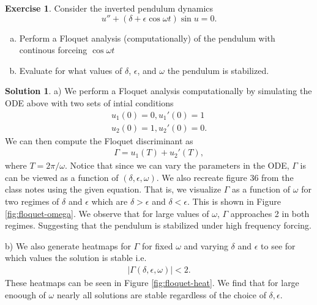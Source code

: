 \documentclass[12pt]{article}
\newcommand{\abs}[1]{ \left| #1 \right| }
\theoremstyle{definition}
\newtheorem{exer}{Exercise}
\newtheorem{sol}{Solution}
\theoremstyle{remark}
\begin{document}
\begin{exer}

Consider the inverted pendulum dynamics
\begin{equation*}
    u'' + (\delta + \epsilon \cos \omega t) \sin u = 0.
\end{equation*}
\begin{enumerate}[(a)]
    \item Perform a Floquet analysis (computationally) of the pendulum with continous forceing $\cos \omega t$ 
    \item Evaluate for what values of $\delta$, $\epsilon$, and $\omega$ the pendulum is stabilized.
\end{enumerate}
\end{exer}

\begin{sol}
    a) We perform a Floquet analysis computationally by simulating the ODE above with two sets of intial conditions
    \begin{align*}
        u_{1}(0) = 0, u_{1}'(0) = 1\\
        u_{2}(0) = 1, u_{2}'(0) = 0.
    \end{align*}
    We can then compute the Floquet discriminant as
    \begin{align*}
        \Gamma = u_{1}(T) + u_{2}'(T),
    \end{align*}
    where $T = 2\pi / \omega$. Notice that since we can vary the parameters in the ODE, $\Gamma$ is can be viewed as a function of $(\delta, \epsilon, \omega)$. We also recreate figure 36 from the class notes using the given equation. That is, we visualize $\Gamma$ as a function of $\omega$ for two regimes of  $\delta$ and  $\epsilon$ which are  $\delta > \epsilon$ and  $\delta < \epsilon$. This is shown in Figure \ref{fig:floquet-omega}. We observe that for large values of $\omega$, $\Gamma$ approaches 2 in both regimes. Suggesting that the pendulum is stabilized under high frequency forcing.

    b) We also generate heatmaps for $\Gamma$ for fixed $\omega$ and varying $\delta$ and $\epsilon$ to see for which values the solution is stable i.e. 
    \begin{align*}
    \abs{\Gamma(\delta, \epsilon, \omega)} < 2. 
    \end{align*}
    These heatmaps can be seen in Figure \ref{fig:floquet-heat}. We find that for large enoough of $\omega$ nearly all solutions are stable regardless of the choice of $\delta, \epsilon$. 


\end{sol}
\end{document}
